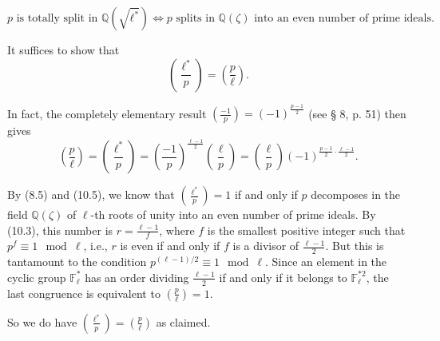 \[
p \text{ is totally split in } \mathbb{Q}(\sqrt{\ell^*}) \iff p \text{ splits in } \mathbb{Q}(\zeta) \text{ into an even number of prime ideals.}
\]

It suffices to show that
\[
\left( \frac{\ell^*}{p} \right) = \left( \frac{p}{\ell} \right).
\]

In fact, the completely elementary result \(\left( \frac{-1}{p} \right) = (-1)^{\frac{p-1}{2}}\) (see § 8, p. 51) then gives
\[
\left( \frac{p}{\ell} \right) = \left( \frac{\ell^*}{p} \right) = \left( \frac{-1}{p} \right)^{\frac{\ell-1}{2}} \left( \frac{\ell}{p} \right) 
= \left( \frac{\ell}{p} \right)(-1)^{\frac{p-1}{2} \cdot \frac{\ell-1}{2}}.
\]

By (8.5) and (10.5), we know that \(\left( \frac{\ell^*}{p} \right) = 1\) if and only if \( p \) decomposes in the field \(\mathbb{Q}(\zeta)\) of 
\(\ell\)-th roots of unity into an even number of prime ideals. 
By (10.3), this number is \( r = \frac{\ell-1}{f} \), where \( f \) is the smallest positive integer such that \( p^f \equiv 1 \mod \ell \), 
i.e., \( r \) is even if and only if \( f \) is a divisor of \(\frac{\ell-1}{2}\). 
But this is tantamount to the condition \( p^{(\ell-1)/2} \equiv 1 \mod \ell \). 
Since an element in the cyclic group \(\mathbb{F}_\ell^*\) has an order dividing \(\frac{\ell-1}{2}\) if and only if 
it belongs to \(\mathbb{F}_\ell^{*2}\), the last congruence is equivalent to \(\left( \frac{p}{\ell} \right) = 1\). 

So we do have \(\left( \frac{\ell^*}{p} \right) = \left( \frac{p}{\ell} \right)\) as claimed.
